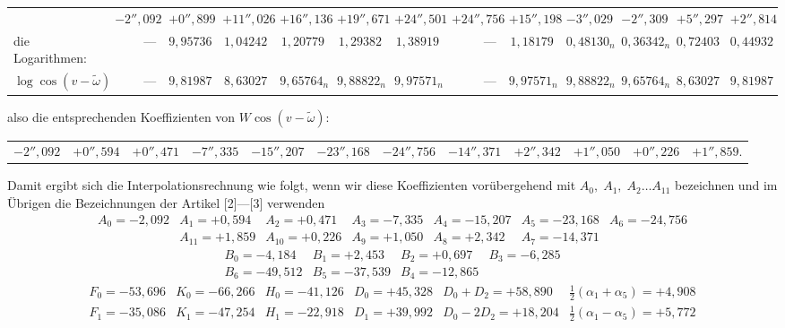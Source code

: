\begin{landscape}
\begin{center}
\begin{tabular}{@{}l*{12}{r}@{}}
&\(-2''{,}092\)&\(+0''{,}899\)&\(+11''{,}026\)&\(+16''{,}136\)&\(+19''{,}671\)&\(+24''{,}501\)&\(+24''{,}756\)&\(+15''{,}198\)&\(-3''{,}029\)&\(-2''{,}309\)&\(+5''{,}297\)&\(+2''{,}814\)\\[4pt]
die Logarithmen:&\(\text{—}\)&\(9{,}95736\)&\(1{,}04242\)&\(1{,}20779\)&\(1{,}29382\)&\(1{,}38919\)&\(\text{—}\)&\(1{,}18179\)&\(0{,}48130_n\)&\(0{,}36342_n\)&\(0{,}72403\)&\(0{,}44932\)\\[4pt]
\(\log\cos(v-\tilde\omega)\)&\(\text{—}\)&\(9{,}81987\)&\(8{,}63027\)&\(9{,}65764_n\)&\(9{,}88822_n\)&\(9{,}97571_n\)&\(\text{—}\)&\(9{,}97571_n\)&\(9{,}88822_n\)&\(9{,}65764_n\)&\(8{,}63027\)&\(9{,}81987\)
\end{tabular}
\endgroup
\end{center}
\noindent also die entsprechenden Koeffizienten von \(W\cos(v-\tilde\omega)\):
\begin{center}
\begingroup\fontsize{9}{12}\selectfont\setlength{\tabcolsep}{4pt}
\begin{tabular}{@{}*{12}{r}@{}}
\(-2''{,}092\)&\(+0''{,}594\)&\(+0''{,}471\)&\(-7''{,}335\)&\(-15''{,}207\)&\(-23''{,}168\)&\(-24''{,}756\)&\(-14''{,}371\)&\(+2''{,}342\)&\(+1''{,}050\)&\(+0''{,}226\)&\(+1''{,}859\).
\end{tabular}
\endgroup
\end{center}
\par\noindent\hspace*{\parindent}Damit ergibt sich die Interpolationsrechnung wie folgt, wenn wir diese Koeffizienten vorübergehend mit \(A_0,\;A_1,\;A_2\ldots A_{11}\) bezeichnen und im Übrigen die Bezeichnungen der Artikel [2]—[3] verwenden
\[
\begin{array}{rrrrrrr}
A_0=-2{,}092&A_1=+0{,}594&A_2=+0{,}471&A_3=-7{,}335&A_4=-15{,}207&A_5=-23{,}168&A_6=-24{,}756\\
&A_{11}=+1{,}859&A_{10}=+0{,}226&A_9=+1{,}050&A_8=+2{,}342&A_7=-14{,}371&
\end{array}
\]
\[
\begin{array}{rrrr}
B_0=-4{,}184&B_1=+2{,}453&B_2=+0{,}697&B_3=-6{,}285\\
B_6=-49{,}512&B_5=-37{,}539&B_4=-12{,}865&
\end{array}
\]
\[
\begin{array}{rrrrrr}
F_0=-53{,}696&K_0=-66{,}266&H_0=-41{,}126&D_0=+45{,}328&D_0+D_2=+58{,}890&\frac12(\alpha_1+\alpha_5)=+4{,}908\\
F_1=-35{,}086&K_1=-47{,}254&H_1=-22{,}918&D_1=+39{,}992&D_0-2D_2=+18{,}204&\frac12(\alpha_1-\alpha_5)=+5{,}772\\

\end{array}\]
\end{landscape}
